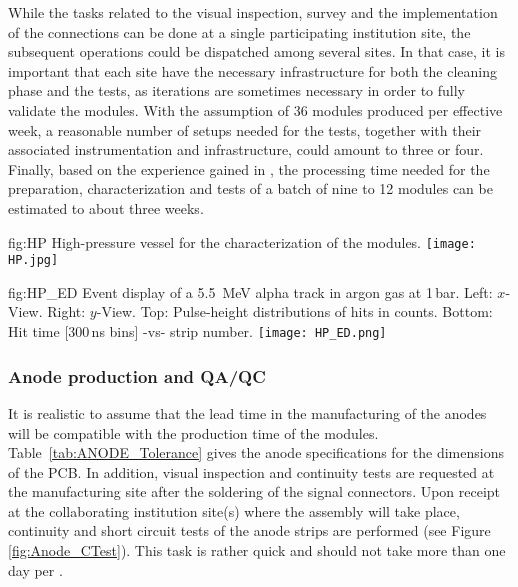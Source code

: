 While the tasks related to the  visual inspection, survey and the implementation of the   connections can be done at 
a single participating institution %
site, the subsequent operations could be dispatched among several sites. In that case, it is  important that each %
site %
have the necessary infrastructure for 
both the cleaning phase and the  tests, as iterations are sometimes necessary in order to fully validate the 
 modules. With the assumption of \num{36}  modules produced per effective week, a reasonable number of setups needed for the   tests, together with their associated instrumentation and infrastructure, could amount to three or four. Finally, based on the experience gained in  , the processing time needed for the preparation, characterization and tests of a batch of nine to \num{12}  modules can be estimated to about three weeks.  

\begin{dunefigure}
{fig:HP} 
{High-pressure vessel for the characterization of the    modules.}
  \texttt{[image: HP.jpg]}
\end{dunefigure}


\begin{dunefigure}
{fig:HP_ED}
{Event display of a \SI{5.5}{MeV} alpha track in argon gas at \num{1}\,bar.  Left: $x$-View. Right: $y$-View. Top: Pulse-height distributions of hits in  counts. Bottom: Hit time [300\,ns bins] -vs- strip number.}
\texttt{[image: HP\_ED.png]}
\end{dunefigure}

\subsubsection{Anode production and QA/QC}
\label{sec:fddp-crp-ANODEprod}
It is realistic to assume that the lead time in the manufacturing of the anodes will be compatible with the production time
of the  modules. Table~\ref{tab:ANODE_Tolerance} gives the anode specifications for the dimensions of the PCB. In addition, visual inspection and continuity tests are requested at the manufacturing site after the soldering of the signal connectors. Upon receipt at the collaborating institution site(s) where the  assembly will take place, continuity and short circuit tests of the anode strips are performed (see Figure \ref{fig:Anode_CTest}). This task is rather quick and should not take more than one day per .  



